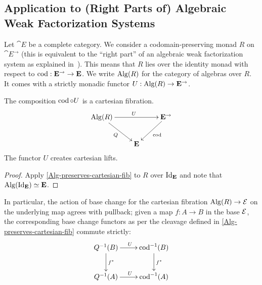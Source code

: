 \documentclass[reqno,10pt,a4paper,oneside]{amsart}
\begin{document}
\subsection{Application to (Right Parts of) Algebraic Weak Factorization Systems}

Let $\cat{E}$ be a complete category.
We consider a codomain-preserving monad $R$ on $\cat{E}^{\to}$ (this is equivalent to the ``right part'' of an algebraic weak factorization system as explained in~\cite{garner:small-object-argument}).
This means that $R$ lies over the identity monad with respect to $\operatorname{cod} : \mathbf{E}^{\to} \to \mathbf{E}$.
We write $\operatorname{Alg}(R)$ for the category of algebras over $R$.
It comes with a strictly monadic functor $U : \operatorname{Alg}(R) \to \mathbf{E}^{\to}$.

\begin{corollary}
\label{Alg-over-cod-pres-monad-is-cartesian-fib}
The composition $\operatorname{cod} \mathbin{\circ} U$ is a cartesian fibration.
\[
\xymatrix{
  \Alg(R)
  \ar[rr]^{U}
  \ar[dr]_{Q}
&&
  \cat{E}^{\to}
  \ar[dl]^{\cod}
\\&
  \cat{E}
}
\]
The functor $U$ creates cartesian lifts.
\end{corollary}

\begin{proof}
Apply \cref{Alg-preserves-cartesian-fib} to $R$ over $\operatorname{Id}_{\mathbf{E}}$ and note that $\operatorname{Alg}(\operatorname{Id}_{\mathbf{E}}) \simeq \mathbf{E}$.
\end{proof}

In particular, the action of base change for the cartesian fibration $\operatorname{Alg}(R) \to \mathcal{E}$ on the underlying map agrees with pullback; given a map $f : A \to B$ in the base $\mathcal{E}$, the corresponding base change functors as per the cleavage defined in \cref{Alg-preserves-cartesian-fib} commute strictly:
\[
\xymatrix{
  Q^{-1}(B)
  \ar[r]^{U}
  \ar[d]^{f^*}
&
  \cod^{-1}(B)
  \ar[d]^{f^*}
\\
  Q^{-1}(A)
  \ar[r]^{U}
&
  \cod^{-1}(A)
}
\]



\end{document}
